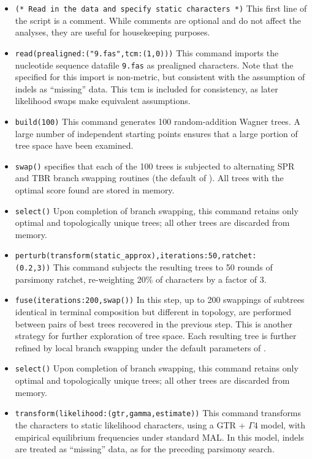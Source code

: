 \begin{itemize}
\item \texttt{(* Read in the data and specify static characters *)} This first line of the script is a comment. While comments are optional and do not affect the analyses, they are useful for housekeeping purposes.
\item \texttt{read(prealigned:("9.fas",tcm:(1,0)))}
This command imports the nucleotide sequence datafile \texttt{9.fas} as prealigned characters. Note that the  specified for this import is non-metric, but consistent with the assumption of indels as ``missing'' data. This tcm is included for consistency, as later likelihood swaps make equivalent assumptions.
\item \texttt{build(100)} This command generates 100 random-addition Wagner trees. A large number of independent starting points ensures that a large portion of tree space have been examined.
\item \texttt{swap()}  specifies that each of the 100 trees is subjected to alternating SPR and TBR branch swapping routines (the default of \poy). All trees with the optimal score found are stored in memory.
\item \texttt{select()} Upon completion of branch swapping, this command retains only optimal and topologically unique trees; all other trees are discarded from memory. 
\item \texttt{perturb(transform(static\_approx),iterations:50,ratchet:\\(0.2,3))} This command subjects the resulting trees to 50 rounds of parsimony ratchet, re-weighting 20\% of characters by a factor of 3.
\item \texttt{fuse(iterations:200,swap())} In this step, up to 200 swappings of subtrees identical in terminal composition but different in topology, are performed between pairs of best trees recovered in the previous step. This is another strategy for further exploration of tree space. Each resulting tree is further refined by local branch swapping under the default parameters of .
\item \texttt{select()} Upon completion of branch swapping, this command retains only optimal and topologically unique trees; all other trees are discarded from memory.
\item \texttt{transform(likelihood:(gtr,gamma,estimate))} This command transforms the characters to static likelihood characters, using a GTR + $\Gamma 4$ model, with empirical equilibrium frequencies under standard MAL. In this model, indels are treated as ``missing'' data, as for the preceding parsimony search.

\end{itemize}
